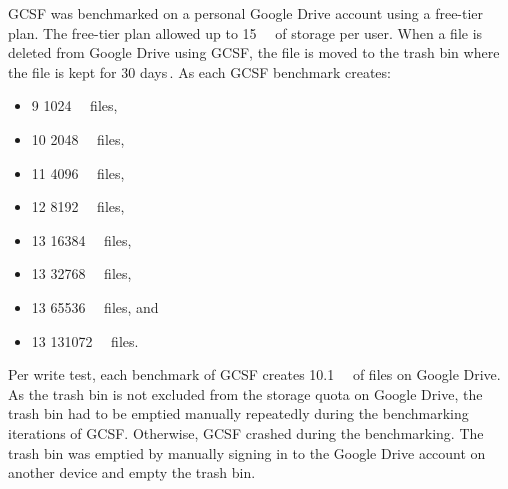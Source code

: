 \gls{GCSF} was benchmarked on a personal Google Drive account using a \mbox{free-tier} plan. The \mbox{free-tier} plan allowed up to \SI[per-mode = symbol]{15}{\giga\byte} of storage per user. When a file is deleted from Google Drive using \gls{GCSF}, the file is moved to the trash bin where the file is kept for 30 days\,\cite{googleDeleteRestoreFiles}. As each \gls{GCSF} benchmark creates:
\begin{itemize}
	\item 9 \SI[per-mode = symbol]{1024}{\kilo\byte} files,
	\item 10 \SI[per-mode = symbol]{2048}{\kilo\byte} files,
	\item 11 \SI[per-mode = symbol]{4096}{\kilo\byte} files,
	\item 12 \SI[per-mode = symbol]{8192}{\kilo\byte} files,
	\item 13 \SI[per-mode = symbol]{16384}{\kilo\byte} files,
	\item 13 \SI[per-mode = symbol]{32768}{\kilo\byte} files,
	\item 13 \SI[per-mode = symbol]{65536}{\kilo\byte} files, and
	\item 13 \SI[per-mode = symbol]{131072}{\kilo\byte} files.
\end{itemize}
Per write test, each benchmark of \gls{GCSF} creates \SI[per-mode = symbol]{10.1}{\giga\byte} of files on Google Drive. As the trash bin is not excluded from the storage quota on Google Drive, the trash bin had to be emptied manually repeatedly during the benchmarking iterations of \gls{GCSF}. Otherwise, \gls{GCSF} crashed during the benchmarking. The trash bin was emptied by manually signing in to the Google Drive account on another device and empty the trash bin.


